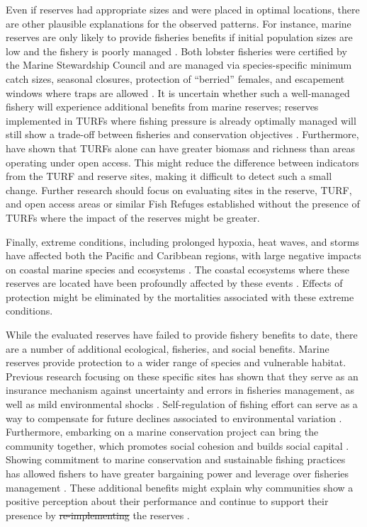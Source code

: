 \documentclass{frontiersSCNS}
\providecommand{\DIFaddtex}[1]{{\protect\color{blue}\uwave{#1}}} %
\providecommand{\DIFdeltex}[1]{{\protect\color{red}\sout{#1}}}                      %
\providecommand{\DIFaddbegin}{} %
\providecommand{\DIFaddend}{} %
\providecommand{\DIFdelbegin}{} %
\providecommand{\DIFdelend}{} %
\providecommand{\DIFadd}[1]{\texorpdfstring{\DIFaddtex{#1}}{#1}} %
\providecommand{\DIFdel}[1]{\texorpdfstring{\DIFdeltex{#1}}{}} %
\begin{document}
Even if reserves had appropriate sizes and were placed in optimal locations, there are other plausible explanations for the observed patterns. For instance, marine reserves are only likely to provide fisheries benefits if initial population sizes are low and the fishery is poorly managed \citep{hilborn_2004,hilborn_2006}. Both lobster fisheries were certified by the Marine Stewardship Council and are managed via species-specific minimum catch sizes, seasonal closures, protection of ``berried'' females, and escapement windows where traps are allowed \citep{dof_website_1993}. It is uncertain whether such a well-managed fishery will experience additional benefits from marine reserves; reserves implemented in TURFs where fishing pressure is already optimally managed will still show a trade-off between fisheries and conservation objectives \citep{lester_2017}. Furthermore, \citet{gelcich_2008} have shown that TURFs alone can have greater biomass and richness than areas operating under open access. This might reduce the difference between indicators from the TURF and reserve sites, making it difficult to detect such a small change. Further research should focus on evaluating sites in the reserve, TURF, and open access areas or similar Fish Refuges established without the presence of TURFs where the impact of the reserves might be greater.

Finally, extreme conditions, including prolonged hypoxia, heat waves, and storms have affected both the Pacific and Caribbean regions, with large negative impacts on coastal marine species and ecosystems \citep{cavole_2016,hughes_2018,breitburg_2018}. The coastal ecosystems where these reserves are located have been profoundly affected by these events \citep{micheli_2012-EU,woodson_2018}. Effects of protection might be eliminated by the mortalities associated with these extreme conditions.

While the evaluated reserves have failed to provide fishery benefits to date, there are a number of additional ecological, fisheries, and social benefits. Marine reserves provide protection to a wider range of species and vulnerable habitat. Previous research focusing on these specific sites has shown that they serve as an insurance mechanism against uncertainty and errors in fisheries management, as well as mild environmental shocks \citep{micheli_2012-EU,deleo_2015,roberts_2017-J9,aalto}. Self-regulation of fishing effort can serve as a way to compensate for future declines associated to environmental variation \citep{finkbeiner_2018}. Furthermore, embarking on a marine conservation project can bring the community together, which promotes social cohesion and builds social capital \citep{fulton_2019}. Showing commitment to marine conservation and sustainable fishing practices has allowed fishers to have greater bargaining power and leverage over fisheries management \citep{prezramrez_2012}. These additional benefits might explain why communities show a positive perception about their performance and continue to support their presence by \DIFdelbegin \DIFdel{re-implementing
}\DIFdelend \DIFaddbegin \DIFadd{re-establishing }\DIFaddend the reserves \citep{ayer_2018}.
\end{document}
